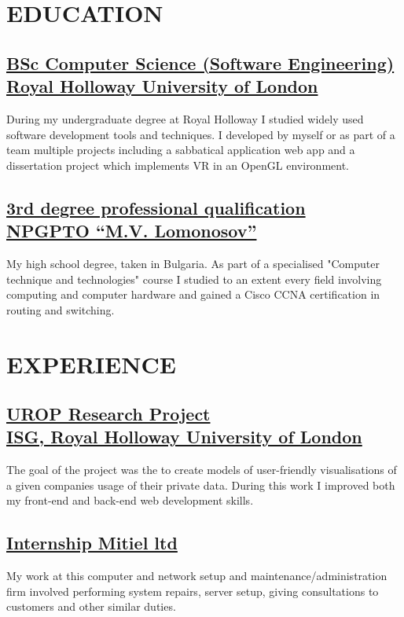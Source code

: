 \documentclass{CVClass}
\begin{document}
\begin{minipage}[t][18cm]{0.6\textwidth}
    \section{EDUCATION}{
		\subsection[2016-2019]
		{\href{https://www.royalholloway.ac.uk/studying-here/undergraduate/computer-science/computer-science-software-engineering/}{BSc Computer Science (Software Engineering)\\
		Royal Holloway University of London}}{
			During my undergraduate degree at Royal Holloway I studied widely used software development tools and techniques. I developed by myself or as part of a team multiple projects including a sabbatical application web app and a dissertation project which implements VR in an OpenGL environment.
		}
		\vskip2mm
		\subsection[2011-2016]
		{\href{https://lomonosov-bg.com/}{3rd degree professional qualification\\
		NPGPTO “M.V. Lomonosov”}}{
			My high school degree, taken in Bulgaria. As part of a specialised "Computer technique and technologies" course I studied to an extent every field involving computing and computer hardware and gained a Cisco CCNA certification in routing and switching.
		}

		\vskip4mm
		\section{EXPERIENCE}
		\vskip1mm
		\subsection[2019-2019]
		{\href{https://scc.rhul.ac.uk/research/interns/kaloian-chokanov/}{UROP Research Project\\
		ISG, Royal Holloway University of London}}{
			The goal of the project was the to create models of user-friendly visualisations of a given companies usage of their private data.
			During this work I improved both my front-end and back-end web development skills.
		}
		\vskip2mm
		\subsection[2019-2019]
		{\href{https://www.mitiel.com/}{Internship \hfill Mitiel ltd}}{
			My work at this computer and network setup and maintenance/administration firm involved performing system repairs, server setup, giving consultations to customers and other similar duties.
		}
	}


\end{minipage}
\end{document}
